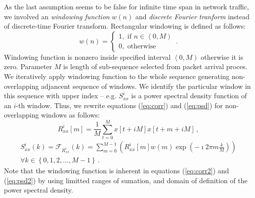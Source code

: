 As the last assumption seems to be false for infinite time span in network  traffic, 
we involved an \emph{windowing function}  $w(n)$ and 
\emph{discrete Fourier tranform} instead of discrete-time 
Fourier transform. Rectangular windowing is defined as follows:
\begin{equation}
w(n) = \left\lbrace \begin{array}{l} 
1, \mbox{ if } n\in \left\langle 0, M \right) \\ 
0, \mbox{ otherwise} \end{array}\right. \,.
\end{equation}
Windowing function is nonzero inside specified interval $\left\langle 0, M \right)$ 
otherwise it is zero. 
Parameter  $M$ is length of sub-sequence selected from packet arrival proces. 
We iteratively apply windowing function to the whole sequence generating 
non-overlapping adjancent sequence of windows. 
We identify the particular window in this sequence with upper index -- 
e.g. $S_{xx}^i$ is a power spectral density function of an $i$-th window.
Thus, we rewrite equations (\ref{eq:corr}) and (\ref{eq:psd}) for non-overlapping 
windows as follows:
\begin{equation}\label{eq:corr2}
R_{xx}^i\left[m\right] = \frac{1}{M} \sum_{t=0}^{M} x\left[t+iM\right]x\left[t+m+iM\right] \, , 
\end{equation}
\begin{equation}\label{eq:psd2}
\begin{split}
S_{xx}^i(k) = \mathcal{F}_{R_{xx}^i}\left(k\right) = \sum_{m=0}^{M-1}
\left( R_{xx}^i \left[m\right] w(m) \exp\left( -\imath 2\pi m\frac{k}{M} \right)\right)\\
\forall k \in \left\{ 0,1,2,...,M-1 \right\}\, . 
\end{split}
\end{equation}
Note that the windowing function is inherent in equations (\ref{eq:corr2}) and (\ref{eq:psd2})
by using limitted ranges of sumation, and domain of definition of the power spectral density.

